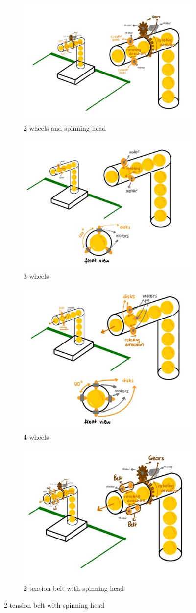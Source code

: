 \documentclass[12pt]{report}
\begin{document}
\begin{appendices}
\begin{figure}[H]
\centering
\begin{subfigure}{.5\textwidth}
  \centering
  \includegraphics[width=.4\linewidth]{2 wheels and spinning head.jpg}
  \caption{2 wheels and spinning head}
  \label{fig:2wheel}
\end{subfigure}%
\begin{subfigure}{.5\textwidth}
  \centering
  \includegraphics[width=.4\linewidth]{3 wheels.jpg}
  \caption{3 wheels}
  \label{fig:3wheel}
\end{subfigure}
\begin{subfigure}{.5\textwidth}
  \centering
  \includegraphics[width=.4\linewidth]{4 wheels.jpg}
  \caption{4 wheels}
  \label{fig:4wheel}
\end{subfigure}%
\begin{subfigure}{.5\textwidth}
  \centering
  \includegraphics[width=.4\linewidth]{2 tension belt with spinning head.jpg}
  \caption{2 tension belt with spinning head}
  \label{fig:2tension}
\end{subfigure}%


\end{figure}
\end{appendices}
\end{document}
